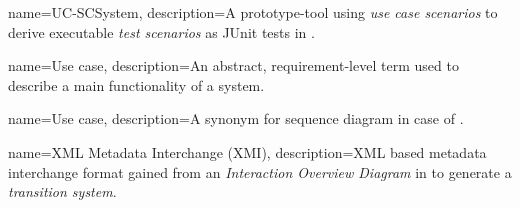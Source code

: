 {
	name={UC-SCSystem},
	description={A prototype-tool using \textit{use case scenarios} to derive executable \textit{test scenarios} as JUnit tests in \cite{ClementineNebut2006}.}
}

{
	name={Use case},
	description={An abstract, requirement-level term used to describe a main functionality of a system.}
}

{
	name={Use case},
	description={A synonym for sequence diagram in case of \cite{ClementineNebut2006}.}
}

{
	name={XML Metadata Interchange (XMI)},
	description={XML based metadata interchange format gained from an \textit{Interaction Overview Diagram} in \cite{NajlaRaza2007} to generate a \textit{transition system}.}
}

